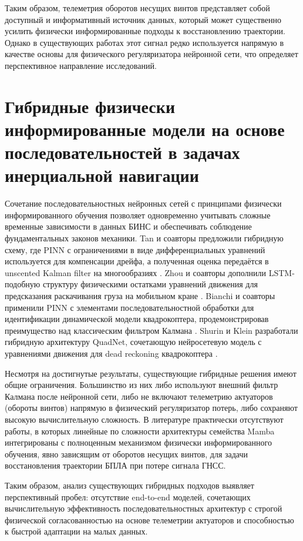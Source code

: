 Таким образом, телеметрия оборотов несущих винтов представляет собой доступный и информативный источник данных, который может существенно усилить физически информированные подходы к восстановлению траектории. Однако в существующих работах этот сигнал редко используется напрямую в качестве основы для физического регуляризатора нейронной сети, что определяет перспективное направление исследований.

\section{Гибридные физически информированные модели на основе последовательностей в задачах инерциальной навигации}
\label{sec:1.7}

Сочетание последовательностных нейронных сетей с принципами физически информированного обучения позволяет одновременно учитывать сложные временные зависимости в данных БИНС и обеспечивать соблюдение фундаментальных законов механики. Tan и соавторы предложили гибридную схему, где PINN с ограничениями в виде дифференциальных уравнений используется для компенсации дрейфа, а полученная оценка передаётся в unscented Kalman filter на многообразиях \cite{Tan2023}. Zhou и соавторы дополнили LSTM-подобную структуру физическими остатками уравнений движения для предсказания раскачивания груза на мобильном кране \cite{Zhou2025}. Bianchi и соавторы применили PINN с элементами последовательностной обработки для идентификации динамической модели квадрокоптера, продемонстрировав преимущество над классическим фильтром Калмана \cite{Bianchi2024}. Shurin и Klein разработали гибридную архитектуру QuadNet, сочетающую нейросетевую модель с уравнениями движения для dead reckoning квадрокоптера \cite{Shurin2022}.

Несмотря на достигнутые результаты, существующие гибридные решения имеют общие ограничения. Большинство из них либо используют внешний фильтр Калмана после нейронной сети, либо не включают телеметрию актуаторов (обороты винтов) напрямую в физический регуляризатор потерь, либо сохраняют высокую вычислительную сложность. В литературе практически отсутствуют работы, в которых линейные по сложности архитектуры семейства Mamba интегрированы с полноценным механизмом физически информированного обучения, явно зависящим от оборотов несущих винтов, для задачи восстановления траектории БПЛА при потере сигнала ГНСС.

Таким образом, анализ существующих гибридных подходов выявляет перспективный пробел: отсутствие end-to-end моделей, сочетающих вычислительную эффективность последовательностных архитектур с строгой физической согласованностью на основе телеметрии актуаторов и способностью к быстрой адаптации на малых данных.

